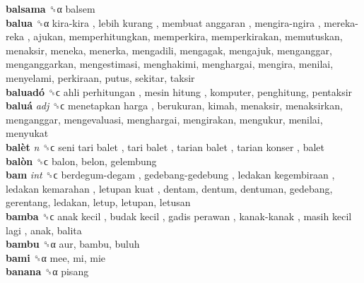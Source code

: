 \textbf{balsama} ␝α  balsem  \\
\textbf{balua} ␝α   kira-kira ,  lebih kurang ,  membuat anggaran ,  mengira-ngira ,  mereka-reka , ajukan, memperhitungkan, memperkira, memperkirakan, memutuskan, menaksir, meneka, menerka, mengadili, mengagak, mengajuk, menganggar, menganggarkan, mengestimasi, menghakimi, menghargai, mengira, menilai, menyelami, perkiraan, putus, sekitar, taksir  \\
\textbf{baluadó} ␝ϲ   ahli perhitungan ,  mesin hitung , komputer, penghitung, pentaksir  \\
\textbf{baluá} \emph{adj}  ␝ϲ   menetapkan harga , berukuran, kimah, menaksir, menaksirkan, menganggar, mengevaluasi, menghargai, mengirakan, mengukur, menilai, menyukat  \\
\textbf{balèt} \emph{n}  ␝ϲ   seni tari balet ,  tari balet ,  tarian balet ,  tarian konser , balet  \\
\textbf{balòn} ␝ϲ  balon, belon, gelembung  \\
\textbf{bam} \emph{int}  ␝ϲ   berdegum-degam ,  gedebang-gedebung ,  ledakan kegembiraan ,  ledakan kemarahan ,  letupan kuat , dentam, dentum, dentuman, gedebang, gerentang, ledakan, letup, letupan, letusan  \\
\textbf{bamba} ␝ϲ   anak kecil ,  budak kecil ,  gadis perawan ,  kanak-kanak ,  masih kecil lagi , anak, balita  \\
\textbf{bambu} ␝α  aur, bambu, buluh  \\
\textbf{bami} ␝α  mee, mi, mie  \\
\textbf{banana} ␝α  pisang  \\
